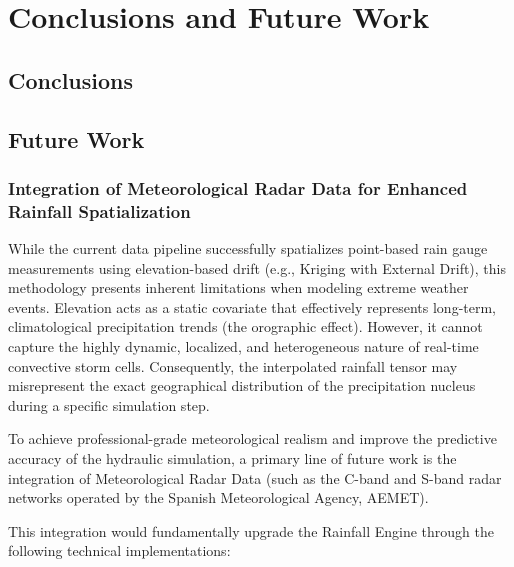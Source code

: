 \chapter{Conclusions and Future Work}
\label{chapter:conclusions_and_future_work}


\section{Conclusions}




\section{Future Work}

\subsection{Integration of Meteorological Radar Data for Enhanced Rainfall Spatialization}

While the current data pipeline successfully spatializes point-based rain gauge measurements using elevation-based 
drift (e.g., Kriging with External Drift), this methodology presents inherent limitations when modeling extreme weather 
events. Elevation acts as a static covariate that effectively represents long-term, climatological precipitation trends 
(the orographic effect). However, it cannot capture the highly dynamic, localized, and heterogeneous nature of real-time 
convective storm cells. Consequently, the interpolated rainfall tensor may misrepresent the exact geographical 
distribution of the precipitation nucleus during a specific simulation step.

To achieve professional-grade meteorological realism and improve the predictive accuracy of the hydraulic simulation, 
a primary line of future work is the integration of Meteorological Radar Data (such as the C-band and S-band radar 
networks operated by the Spanish Meteorological Agency, AEMET).

This integration would fundamentally upgrade the Rainfall Engine through the following technical implementations:

